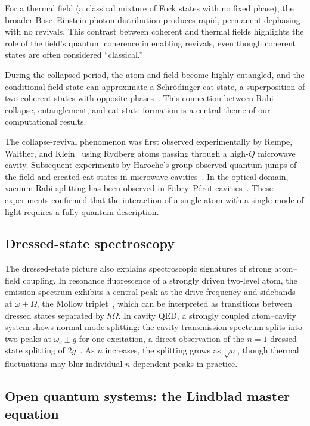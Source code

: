 \documentclass[%
 reprint,
 amsmath,amssymb,
 aps,
]{revtex4-2}
\begin{document}
For a thermal field (a classical mixture of Fock states with no fixed phase), the broader Bose--Einstein photon distribution produces rapid, permanent dephasing with no revivals. This contrast between coherent and thermal fields highlights the role of the field's quantum coherence in enabling revivals, even though coherent states are often considered ``classical.''

During the collapsed period, the atom and field become highly entangled, and the conditional field state can approximate a Schr\"{o}dinger cat state, a superposition of two coherent states with opposite phases~\cite{gea-banacloche1990}. This connection between Rabi collapse, entanglement, and cat-state formation is a central theme of our computational results.

The collapse-revival phenomenon was first observed experimentally by Rempe, Walther, and Klein~\cite{rempe1987} using Rydberg atoms passing through a high-$Q$ microwave cavity. Subsequent experiments by Haroche's group observed quantum jumps of the field and created cat states in microwave cavities~\cite{brune1996}. In the optical domain, vacuum Rabi splitting has been observed in Fabry--P\'{e}rot cavities~\cite{thompson1992}. These experiments confirmed that the interaction of a single atom with a single mode of light requires a fully quantum description.


\subsection{Dressed-state spectroscopy}
\label{sec:dressed_spectroscopy}

The dressed-state picture also explains spectroscopic signatures of strong atom--field coupling. In resonance fluorescence of a strongly driven two-level atom, the emission spectrum exhibits a central peak at the drive frequency and sidebands at $\omega \pm \Omega$, the Mollow triplet~\cite{mollow1969}, which can be interpreted as transitions between dressed states separated by $\hbar\Omega$. In cavity QED, a strongly coupled atom--cavity system shows normal-mode splitting: the cavity transmission spectrum splits into two peaks at $\omega_c \pm g$ for one excitation, a direct observation of the $n = 1$ dressed-state splitting of $2g$~\cite{thompson1992}. As $n$ increases, the splitting grows as $\sqrt{n}$, though thermal fluctuations may blur individual $n$-dependent peaks in practice.


\subsection{Open quantum systems: the Lindblad master equation}
\label{sec:lindblad}
\end{document}
